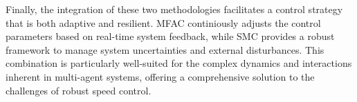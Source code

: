 \documentclass[journal,twocolumn]{IEEEtran}
\begin{document}
    Finally, the integration of these two methodologies facilitates a control strategy that is both adaptive and resilient. MFAC continiously adjusts the control parameters based on real-time system feedback, while SMC provides a robust framework to manage system uncertainties and external disturbances. This combination is particularly well-suited for the complex dynamics and interactions inherent in multi-agent systems, offering a comprehensive solution to the challenges of robust speed control.

    
\end{document}
